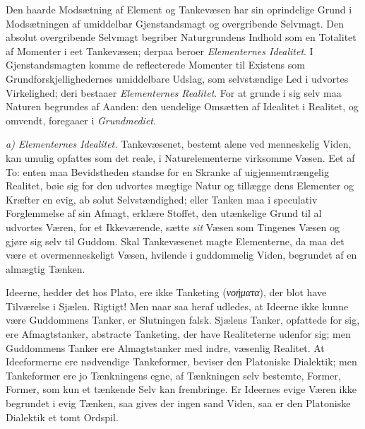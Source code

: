 \documentclass[12pt,a4paper]{book}
\newcommand{\runin}[1]{\emph{#1}\hspace{0.4em}}
\begin{document}
Den haarde Modsætning af Element og Tankevæsen har sin oprindelige Grund
i Modsætningen af umiddelbar Gjenstandsmagt og overgribende Selvmagt. Den
absolut overgribende Selvmagt begriber Naturgrundens Indhold som en
Totalitet af Momenter i eet Tankevæsen; derpaa beroer
\emph{Elementernes Idealitet}. I Gjenstandsmagten komme de reflecterede
Momenter til Existens som Grundforskjellighedernes umiddelbare Udslag, som
selvstændige Led i udvortes Virkelighed; deri bestaaer
\emph{Elementernes Realitet}. For at grunde i sig selv maa Naturen
begrundes af Aanden: den uendelige Omsætten af Idealitet i Realitet, og
omvendt, foregaaer i \emph{Grundmediet}.

\runin{a) Elementernes Idealitet.} Tankevæsenet, bestemt alene ved
menneskelig Viden, kan umulig opfattes som det reale, i Naturelementerne
virksomme Væsen. Eet af To: enten maa Bevidstheden standse for en Skranke
af uigjennemtrængelig Realitet, bøie sig for den udvortes mægtige Natur og
tillægge dens Elementer og Kræfter en evig, ab\-%
solut Selvstændighed; eller Tanken maa i speculativ Forglemmelse af sin
Afmagt, erklære Stoffet, den utænkelige Grund til al udvortes Væren, for
et Ikkeværende, sætte \emph{sit} Væsen som Tingenes Væsen og gjøre sig selv
til Guddom. Skal Tankevæsenet magte Elementerne, da maa det være et
overmenneskeligt Væsen, hvilende i guddommelig Viden, begrundet af en
almægtig Tænken.

Ideerne, hedder det hos Plato, ere ikke Tanketing
(\textit{νοήματα}), der blot have Tilværelse i Sjælen. Rigtigt! Men naar
saa heraf udledes, at Ideerne ikke kunne være Guddommens Tanker, er
Slutningen falsk. Sjælens Tanker, opfattede for sig, ere Afmagtstanker,
abstracte Tanketing, der have Realiteterne udenfor sig; men Guddommens
Tanker ere Almagtstanker med indre, væsenlig Realitet. At Ideeformerne
ere nødvendige Tankeformer, beviser den Platoniske Dialektik; men
Tankeformer ere jo Tænkningens egne, af Tænkningen selv bestemte, Former,
Former, som kun et tænkende Selv kan frembringe. Er Ideernes evige Væren
ikke begrundet i evig Tænken, saa gives der ingen sand Viden, saa er den
Platoniske Dialektik et tomt Ordspil.
\end{document}
